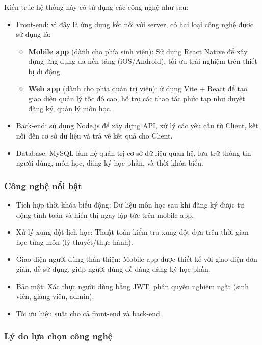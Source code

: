\documentclass[../main.tex]{subfiles}
\begin{document}

Kiến trúc hệ thống này có sử dụng các công nghệ như sau:

\begin{itemize}
    \item Front-end: vì đây là ứng dụng kết nối với server, có hai loại công nghệ được sử dụng là:
    \begin{itemize}
        \item \textbf{Mobile app} (dành cho phía sinh viên): Sử dụng React Native để xây dựng ứng dụng đa nền tảng (iOS/Android), tối ưu trải nghiệm trên thiết bị di động.
        \item \textbf{Web app} (dành cho phía  quản trị viên): ử dụng Vite + React để tạo giao diện quản lý tốc độ cao, hỗ trợ các thao tác phức tạp như duyệt đăng ký, quản lý môn học.
    \end{itemize}
    \item Back-end: sử dụng Node.js để xây dựng API, xử lý các yêu cầu từ Client, kết nối đến cơ sở dữ liệu và trả về kết quả cho Client.
    \item Database: MySQL làm hệ quản trị cơ sở dữ liệu quan hệ, lưu trữ thông tin người dùng, môn học, đăng ký học phần, và thời khóa biểu.
\end{itemize}

\subsubsection*{Công nghệ nổi bật}

\begin{itemize}
    \item Tích hợp thời khóa biểu động: Dữ liệu môn học sau khi đăng ký được tự động tính toán và hiển thị ngay lập tức trên mobile app.
    \item Xử lý xung đột lịch học: Thuật toán kiểm tra xung đột dựa trên thời gian học từng môn (lý thuyết/thực hành).
    \item Giao diện người dùng thân thiện: Mobile app được thiết kế với giao diện đơn giản, dễ sử dụng, giúp người dùng dễ dàng đăng ký học phần.
    \item Bảo mật: Xác thực người dùng bằng JWT, phân quyền nghiêm ngặt (sinh viên, giảng viên, admin).
    \item Tối ưu hiệu suất cho cả front-end và back-end.
\end{itemize}

\subsubsection*{Lý do lựa chọn công nghệ}
\end{document}
